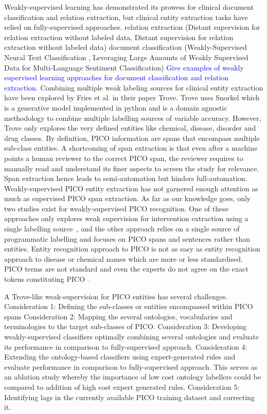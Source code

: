 \documentclass[10.7pt,]{article}
\begin{document}
Weakly-supervised learning has demonstrated its prowess for clinical document classification and relation extraction, but clinical entity extraction tasks have relied on fully-supervised approaches.
relation extraction (Distant supervision for relation extraction without labeled data, Distant supervision for relation extraction without labeled data)
document classification (Weakly-Supervised Neural Text Classification
, Leveraging Large Amounts of Weakly Supervised Data for
Multi-Language Sentiment Classification)
\textcolor{blue}{Give examples of weakly supervised learning approaches for document classification and relation extraction.}
Combining multiple weak labeling sources for clinical entity extraction have been explored by Fries et al. in their paper Trove.
Trove uses Snorkel which is a generative model implemented in python and is a domain agnostic methodology to combine multiple labelling sources of variable accuracy.
However, Trove only explores the very defined entities like chemical, disease, disorder and drug classes. 
By definition, PICO information are spans that encompass multiple sub-class entities.
A shortcoming of span extraction is that even after a machine points a human reviewer to the correct PICO span, the reviewer requires to manually read and understand its finer aspects to screen the study for relevance.
Span extraction hence leads to semi-automation but hinders full-automation.
Weakly-supervised PICO entity extraction has not garnered enough attention as much as supervised PICO span extraction.
As far as our knowledge goes, only two studies exist for weakly-supervised PICO recognition.
One of these approaches only explores weak supervision for intervention extraction using a single labelling source~\cite{dhrangadhariya2022distant}, and the other approach relies on a single source of programmatic labelling and focuses on PICO spans and sentences rather than entities.
Entity recognition approach to PICO is not as easy as entity recognition approach to disease or chemical names which are more or less standardised.
PICO terms are not standard and even the experts do not agree on the exact tokens constituting PICO~\cite{brockmeier2019improving}.

A Trove-like weak-supervision for PICO entities has several challenges.
Consideration 1: Defining the sub-classes or entities encompassed within PICO spans
Consideration 2: Mapping the several ontologies, vocabularies and terminologies to the target sub-classes of PICO.
Consideration 3: Developing weakly-supervised classifiers optimally combining several ontologies and evaluate its performance in comparison to fully-supervised approach.
Consideration 4: Extending the ontology-based classifiers using expert-generated rules and evaluate performance in comparison to fully-supervised approach. This serves as an ablation study whereby the importance of low cost ontology labellers could be compared to addition of high cost expert generated rules.
Consideration 5: Identifying lags in the currently available PICO training dataset and correcting it.
\end{document}
